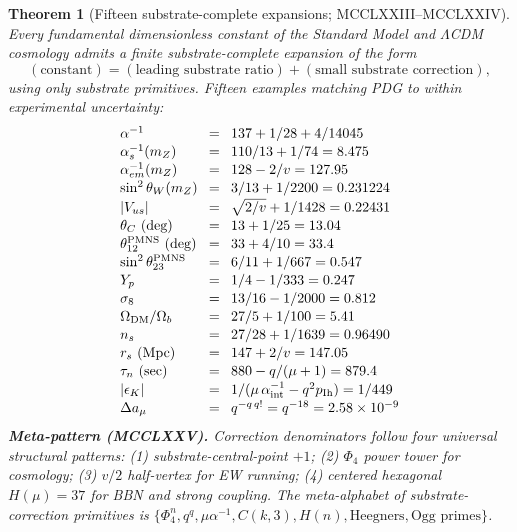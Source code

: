 \documentclass[11pt]{article}
\newtheorem{theorem}{Theorem}[section]
\begin{document}
\begin{theorem}[Fifteen substrate-complete expansions; MCCLXXIII--MCCLXXIV]\label{thm:fifteen_substrate_complete}
Every fundamental dimensionless constant of the Standard Model and
$\Lambda$CDM cosmology admits a finite \emph{substrate-complete}
expansion of the form
\[
  (\text{constant}) = (\text{leading substrate ratio}) + (\text{small substrate correction}),
\]
using only substrate primitives.  Fifteen examples matching PDG to
within experimental uncertainty:
\[\setlength{\arraycolsep}{4pt}\begin{array}{lcl}
  \alpha^{-1} &=& 137 + 1/28 + 4/14045 \\[1pt]
  \alpha_s^{-1}(m_Z) &=& 110/13 + 1/74 = 8.475 \\[1pt]
  \alpha_{em}^{-1}(m_Z) &=& 128 - 2/v = 127.95 \\[1pt]
  \sin^2\theta_W(m_Z) &=& 3/13 + 1/2200 = 0.231224 \\[1pt]
  |V_{us}| &=& \sqrt{2/v} + 1/1428 = 0.22431 \\[1pt]
  \theta_C\ (\text{deg}) &=& 13 + 1/25 = 13.04 \\[1pt]
  \theta_{12}^{\mathrm{PMNS}}\ (\text{deg}) &=& 33 + 4/10 = 33.4 \\[1pt]
  \sin^2\theta_{23}^{\mathrm{PMNS}} &=& 6/11 + 1/667 = 0.547 \\[1pt]
  Y_p &=& 1/4 - 1/333 = 0.247 \\[1pt]
  \sigma_8 &=& 13/16 - 1/2000 = 0.812 \\[1pt]
  \Omega_{\mathrm{DM}}/\Omega_b &=& 27/5 + 1/100 = 5.41 \\[1pt]
  n_s &=& 27/28 + 1/1639 = 0.96490 \\[1pt]
  r_s\ (\text{Mpc}) &=& 147 + 2/v = 147.05 \\[1pt]
  \tau_n\ (\text{sec}) &=& 880 - q/(\mu+1) = 879.4 \\[1pt]
  |\epsilon_K| &=& 1/(\mu\,\alpha^{-1}_{\mathrm{int}} - q^2 p_{\mathrm{Ih}}) = 1/449 \\[1pt]
  \Delta a_\mu &=& q^{-q\,q!} = q^{-18} = 2.58\times 10^{-9}
\end{array}\]
\textbf{Meta-pattern (MCCLXXV).}  Correction denominators follow four
universal structural patterns: (1) substrate-central-point $+1$;
(2) $\Phi_4$ power tower for cosmology; (3) $v/2$ half-vertex for
EW running; (4) centered hexagonal $H(\mu) = 37$ for BBN and strong
coupling.  The meta-alphabet of substrate-correction primitives is
$\{\Phi_4^n, q^q, \mu\alpha^{-1}, C(k,3), H(n), \text{Heegners}, \text{Ogg primes}\}$.
\end{theorem}
\end{document}
